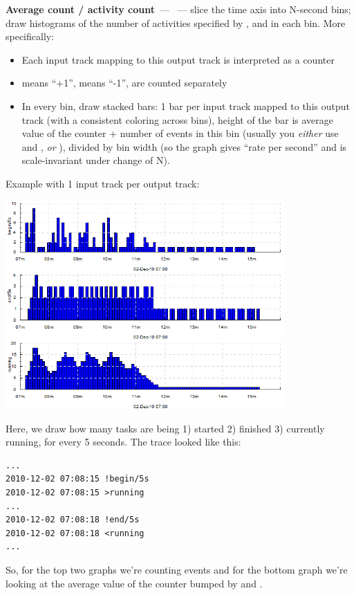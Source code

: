 \documentclass{article}
\begin{document}
\pagebreak
\noindent
\textbf{Average count / activity count}~--- ~--- slice the time axis into N-second bins; draw histograms of the number of activities specified by \hlverb{>}, \hlverb{<} and \hlverb{!} in each bin. More specifically:
\begin{itemize}
 \item Each input track mapping to this output track is interpreted as a counter
 \item \hlverb{>} means ``+1'', \hlverb{<} means ``-1'', \hlverb{!} are counted separately
 \item In every bin, draw stacked bars: 1 bar per input track mapped to this output track (with a consistent coloring across bins), height of the bar is average value of the counter + number of \hlverb{!} events in this bin (usually you \emph{either} use \hlverb{>} and \hlverb{<}, \emph{or} \hlverb{!}), divided by bin width (so the graph gives ``rate per second'' and is scale-invariant under change of N).
\end{itemize}

Example with 1 input track per output track: 

\centerline{\includegraphics[width=0.8\textwidth]{pics/tplot/acount-begin-end-running.png}}

Here, we draw how many tasks are being 1) started 2) finished 3) currently running, for every 5 seconds. The trace looked like this:

\begin{verbatim}
...
2010-12-02 07:08:15 !begin/5s
2010-12-02 07:08:15 >running
...
2010-12-02 07:08:18 !end/5s
2010-12-02 07:08:18 <running
...
\end{verbatim}

So, for the top two graphs we're counting \hlverb{!} events and for the bottom graph we're looking at the average value of the counter bumped by \hlverb{>} and \hlverb{<}.
\end{document}
